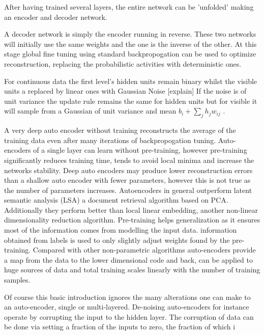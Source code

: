 After having trained several layers, the entire network can be 'unfolded' making an encoder and decoder network\citep{dengthree}.

A decoder network is simply the encoder running in reverse.
These two networks will initially  use the same weights and the one is the inverse of the other.
At this stage global fine tuning using standard backpropogation can be used to optimize reconstruction, replacing the probabilistic activities with deterministic ones\citep{hinton2006reducing}.

For continuous data the first level's hidden units remain binary whilst the visible units a replaced by linear ones with Gaussian Noise [explain]
If the noise is of unit variance the update rule remains the same for hidden units but for visible it will sample from a Gaussian of unit variance and mean $b_i +\sum_j h_j w_{ij}$ \citep{hinton2006reducing}.


A very deep auto encoder without training reconstructs the average of the training data even after many iterations of backpropogation tuning\citep{hinton2006reducing}.
Auto-encoders of a single layer can learn without pre-training, however pre-training significantly reduces training time, tends to avoid local minima and increase the networks stability\citep{erhan2010does}.
Deep auto encoders may produce lower reconstruction errors than a shallow auto encoder with fewer parameters, however this is not true as the number of parameters increases.
Autoencoders in general outperform latent semantic analysis (LSA) a document retrieval algorithm based on PCA\citep{hinton2006reducing}.
Additionally they perform better than local linear embedding, another non-linear dimensionality reduction algorithm.
Pre-training helps generalization as it ensures most of the information comes from modelling the input data.
information obtained from labels is used to only slightly adjust weights found by the pre-training.
Compared with other non-parametric algorithms auto-encoders provide a map from the data to the lower dimensional code and back, can be applied to huge sources of data and total training scales linearly with the number of training samples\citep{hinton2006reducing}.

Of course this basic introduction ignores the many alterations one can make to an auto-encoder, single or multi-layered.
De-noising auto-encoders for instance operate by corrupting the input to the hidden layer. 
The corruption of data can be done via setting a fraction of the inputs to zero, the fraction of which i




